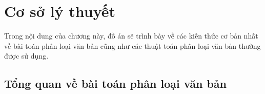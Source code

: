 
\chapter{Cơ sở lý thuyết} \label{theory-basis}


Trong nội dung của chương này, đồ án sẽ trình bày về các kiến thức cơ bản nhất về bài toán phân loại văn bản cũng như các thuật toán phân loại văn bản thường được sử dụng.

\section{Tổng quan về bài toán phân loại văn bản}


